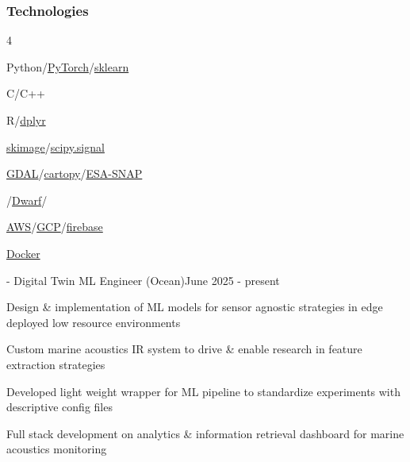 \documentclass{article}
\newenvironment{mylist}[2]{
  \subsubsection*{#1}
  \begin{multicols}{#2}
  \small
  \begin{list}{}{}
   \setlength{\topsep}{0pt}
   \setlength{\itemsep}{1pt}
   \setlength{\parskip}{0pt}
   \setlength{\parsep}{0pt}}{\end{list}\end{multicols}\normalsize}
\newenvironment{**mylist}[2]{

\subsubsection*{#1\hfill#2}
  \small
  \begin{list}{}{}
    \setlength{\topsep}{0pt}
   \setlength{\itemsep}{1pt}
   \setlength{\parskip}{0pt}
   \setlength{\parsep}{0pt}}{\end{list}\normalsize}
\def\bsp{-.3in}
\begin{document}
\begin{mylist}{Technologies}{4}
\item Python/\href{https://pytorch.org/}{PyTorch}/\href{https://scikit-learn.org/stable/}{sklearn}
\item C/C++
\item R/\href{https://dplyr.tidyverse.org/}{dplyr}
\item \href{https://scikit-image.org/}{skimage}/\href{https://scipy.github.io/devdocs/reference/signal.html#module-scipy.signal}{scipy.signal}
\item \href{https://gdal.org/en/stable/}{GDAL}/\href{https://scitools.org.uk/cartopy/docs/latest/}{cartopy}/\href{https://step.esa.int/main/download/snap-download/}{ESA-SNAP}
\item \href{https://pypi.org/project/gtirb/}{}/\href{https://dwarfstd.org/}{Dwarf}/\href{https://pypi.org/project/asts/}{}
\item \href{https://aws.amazon.com/}{AWS}/\href{https://cloud.google.com/}{GCP}/\href{https://firebase.google.com/}{firebase}
\item \href{https://www.docker.com/}{Docker}
\end{mylist}

\newcommand{\BSec}[1]{
\noindent{\hspace{\bsp} \LARGE{\bf #1}{ }\hrulefill}}
\TabPositions{2.1in} %
\def\tabb{\tab- }  %

\BSec{}%
\begin{**mylist}{\href{https://blueoasis.pt/}{} \tabb Digital Twin ML Engineer (Ocean)}{June 2025 - present}
\item Design \& implementation of ML models for sensor agnostic strategies in edge deployed low resource environments
\item Custom marine acoustics IR system to drive \& enable research in feature extraction strategies
\item Developed light weight wrapper for ML pipeline to standardize experiments with descriptive config files
\item Full stack development on analytics \& information retrieval dashboard for marine acoustics monitoring
\end{**mylist}
\end{document}
